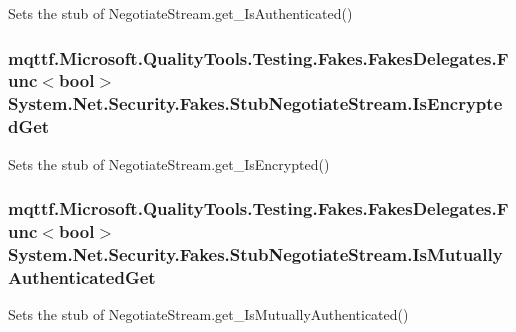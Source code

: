Sets the stub of Negotiate\-Stream.\-get\-\_\-\-Is\-Authenticated()

\hypertarget{class_system_1_1_net_1_1_security_1_1_fakes_1_1_stub_negotiate_stream_ad709e13bb317ad38e334b4fc46fcd56c}{
\subsubsection[{Is\-Encrypted\-Get}]{\setlength{\rightskip}{0pt plus 5cm}mqttf.\-Microsoft.\-Quality\-Tools.\-Testing.\-Fakes.\-Fakes\-Delegates.\-Func$<$bool$>$ System.\-Net.\-Security.\-Fakes.\-Stub\-Negotiate\-Stream.\-Is\-Encrypted\-Get}}\label{class_system_1_1_net_1_1_security_1_1_fakes_1_1_stub_negotiate_stream_ad709e13bb317ad38e334b4fc46fcd56c}


Sets the stub of Negotiate\-Stream.\-get\-\_\-\-Is\-Encrypted()

\hypertarget{class_system_1_1_net_1_1_security_1_1_fakes_1_1_stub_negotiate_stream_a008256f6713bc0c664d45bffd1d3a66c}{
\subsubsection[{Is\-Mutually\-Authenticated\-Get}]{\setlength{\rightskip}{0pt plus 5cm}mqttf.\-Microsoft.\-Quality\-Tools.\-Testing.\-Fakes.\-Fakes\-Delegates.\-Func$<$bool$>$ System.\-Net.\-Security.\-Fakes.\-Stub\-Negotiate\-Stream.\-Is\-Mutually\-Authenticated\-Get}}\label{class_system_1_1_net_1_1_security_1_1_fakes_1_1_stub_negotiate_stream_a008256f6713bc0c664d45bffd1d3a66c}


Sets the stub of Negotiate\-Stream.\-get\-\_\-\-Is\-Mutually\-Authenticated()

